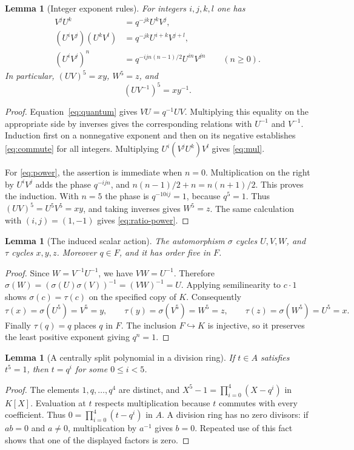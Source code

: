 \documentclass[11pt,letterpaper]{article}
\newtheorem{lemma}[theorem]{Lemma}
\theoremstyle{definition}
\theoremstyle{remark}
\begin{document}
\begin{lemma}[Integer exponent rules]\label{lem:monomial}
For integers $i,j,k,l$ one has
\begin{align}
V^jU^k&=q^{-jk}U^kV^j,\label{eq:commute}\\
(U^iV^j)(U^kV^l)&=q^{-jk}U^{i+k}V^{j+l},\label{eq:mul}\\
(U^iV^j)^n&=q^{-ij n(n-1)/2}U^{in}V^{jn}\qquad(n\geq0).
\label{eq:power}
\end{align}
In particular, $(UV)^5=xy$, $W^5=z$, and
\begin{equation}\label{eq:ratio-power}
(UV^{-1})^5=xy^{-1}.
\end{equation}
\end{lemma}
\begin{proof}
Equation~\eqref{eq:quantum} gives $VU=q^{-1}UV$. Multiplying this equality
on the appropriate side by inverses gives the corresponding relations with
$U^{-1}$ and $V^{-1}$. Induction first on a nonnegative exponent and then on
its negative establishes \eqref{eq:commute} for all integers. Multiplying
$U^i(V^jU^k)V^l$ gives \eqref{eq:mul}.

For \eqref{eq:power}, the assertion is immediate when $n=0$. Multiplication
on the right by $U^iV^j$ adds the phase $q^{-ij n}$, and
$n(n-1)/2+n=n(n+1)/2$. This proves the induction. With $n=5$ the phase is
$q^{-10ij}=1$, because $q^5=1$. Thus $(UV)^5=U^5V^5=xy$, and taking
inverses gives $W^5=z$. The same calculation with $(i,j)=(1,-1)$ gives
\eqref{eq:ratio-power}.
\end{proof}

\begin{lemma}[The induced scalar action]\label{lem:cycle}
The automorphism $\sigma$ cycles $U,V,W$, and $\tau$ cycles $x,y,z$.
Moreover $q\in F$, and it has order five in $F$.
\end{lemma}
\begin{proof}
Since $W=V^{-1}U^{-1}$, we have $VW=U^{-1}$. Therefore
$\sigma(W)=(\sigma(U)\sigma(V))^{-1}=(VW)^{-1}=U$.
Applying semilinearity to $c\cdot1$ shows $\sigma(c)=\tau(c)$ on the
specified copy of $K$. Consequently
\[
\tau(x)=\sigma(U^5)=V^5=y,\qquad
\tau(y)=\sigma(V^5)=W^5=z,\qquad
\tau(z)=\sigma(W^5)=U^5=x.
\]
Finally $\tau(q)=q$ places $q$ in $F$. The inclusion $F\hookrightarrow K$
is injective, so it preserves the least positive exponent giving $q^n=1$.
\end{proof}

\begin{lemma}[A centrally split polynomial in a division ring]\label{lem:split}
If $t\in A$ satisfies $t^5=1$, then $t=q^i$ for some $0\leq i<5$.
\end{lemma}
\begin{proof}
The elements $1,q,\ldots,q^4$ are distinct, and
$X^5-1=\prod_{i=0}^4(X-q^i)$ in $K[X]$. Evaluation at $t$ respects
multiplication because $t$ commutes with every coefficient. Thus
$0=\prod_{i=0}^4(t-q^i)$ in $A$. A division ring has no zero divisors:
if $ab=0$ and $a\ne0$, multiplication by $a^{-1}$ gives $b=0$.
Repeated use of this fact shows that one of the displayed factors is zero.
\end{proof}
\end{document}
